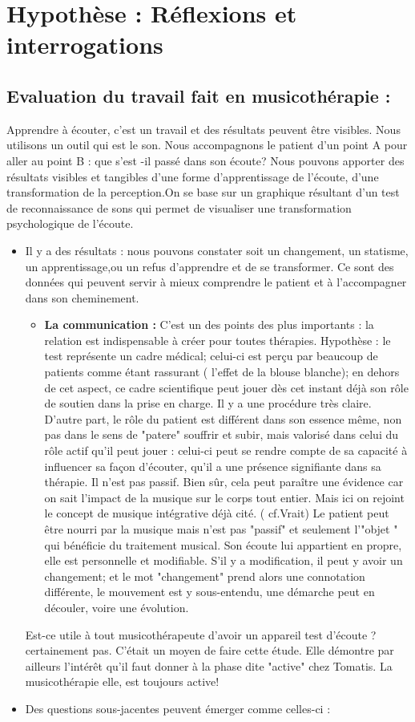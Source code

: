 \chapter{Hypothèse : Réflexions et interrogations}

\section{Evaluation du travail fait en musicothérapie : }

Apprendre à écouter, c'est un travail et des résultats peuvent être
visibles. Nous utilisons un outil qui est le son. Nous accompagnons
le patient d'un point A pour aller au point B : que s'est -il passé
dans son écoute? Nous pouvons apporter des résultats visibles et tangibles
d'une forme d'apprentissage de l'écoute, d'une transformation de la
perception.On se base sur un graphique résultant d'un test de reconnaissance
de sons qui permet de visualiser une transformation psychologique
de l'écoute. 
\begin{itemize}
\item Il y a des résultats : nous pouvons constater soit un changement,
un statisme, un apprentissage,ou un refus d'apprendre et de se transformer.
Ce sont des données qui peuvent servir à mieux comprendre le patient
et à l'accompagner dans son cheminement.
\begin{itemize}
	\item \textbf{La communication : }
	C'est un des points des plus importants : la relation est indispensable à créer pour toutes thérapies.
	Hypothèse : le test représente un cadre médical; celui-ci est perçu par beaucoup de patients comme étant rassurant ( l'effet de la blouse blanche); en dehors de cet aspect, ce cadre scientifique peut jouer dès cet instant déjà son rôle de soutien dans la prise en charge.
	Il y a une procédure très claire.
	D'autre part, le rôle du patient est différent dans son essence même, non pas dans le sens de "patere" souffrir et subir, mais valorisé dans celui du rôle actif qu'il peut jouer : celui-ci peut se rendre compte de sa capacité à influencer sa façon d'écouter, qu'il a une présence signifiante dans sa thérapie.  Il n'est pas passif. Bien sûr, cela peut paraître une évidence car on sait l'impact de la musique sur le corps tout entier. Mais ici on rejoint  le concept de musique intégrative déjà cité. ( cf.Vrait) Le patient peut être nourri par la musique mais n'est pas "passif" et seulement l'"objet " qui bénéficie du traitement musical. Son  écoute lui appartient en propre, elle est personnelle et modifiable. S'il y a modification, il peut y avoir un changement; et le mot "changement" prend alors une connotation différente,  le mouvement est y  sous-entendu,  une démarche peut en découler, voire une évolution. 
\end{itemize}


Est-ce utile à tout musicothérapeute d'avoir un appareil test d'écoute ? certainement pas. C'était un moyen de faire cette étude. Elle démontre par ailleurs  l'intérêt qu'il faut donner à la phase dite "active" chez Tomatis. La musicothérapie elle, est toujours active!
\item Des questions sous-jacentes peuvent émerger comme celles-ci :
\end{itemize}
